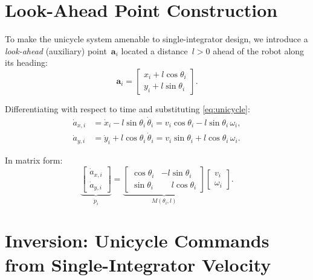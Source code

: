 \documentclass[11pt,a4paper]{article}
\newcommand{\dpdt}[1]{\dot{p}_{#1}}
\begin{document}
\section{Look-Ahead Point Construction}

To make the unicycle system amenable to single-integrator design, we
introduce a \emph{look-ahead} (auxiliary) point~$\mathbf{a}_i$ located a
distance~$l>0$ ahead of the robot along its heading:
\begin{equation}\label{eq:lookahead_pos}
  \mathbf{a}_i
  = \begin{bmatrix}x_i + l\cos\theta_i\\ y_i + l\sin\theta_i\end{bmatrix}.
\end{equation}

\noindent Differentiating with respect to time and substituting
\eqref{eq:unicycle}:
\begin{align}
  \dot a_{x,i} &= \dot x_i - l\sin\theta_i\,\dot\theta_i
               = v_i\cos\theta_i - l\sin\theta_i\,\omega_i, \label{eq:adot_x}\\
  \dot a_{y,i} &= \dot y_i + l\cos\theta_i\,\dot\theta_i
               = v_i\sin\theta_i + l\cos\theta_i\,\omega_i. \label{eq:adot_y}
\end{align}

In matrix form:
\begin{equation}\label{eq:forward}
  \underbrace{\begin{bmatrix}\dot a_{x,i}\\\dot a_{y,i}\end{bmatrix}}_{\dpdt{i}}
  =
  \underbrace{\begin{bmatrix}
    \cos\theta_i & -l\sin\theta_i \\
    \sin\theta_i & \phantom{-}l\cos\theta_i
  \end{bmatrix}}_{M(\theta_i,l)}
  \begin{bmatrix}v_i\\\omega_i\end{bmatrix}.
\end{equation}

\section{Inversion: Unicycle Commands from Single-Integrator Velocity}
\end{document}
